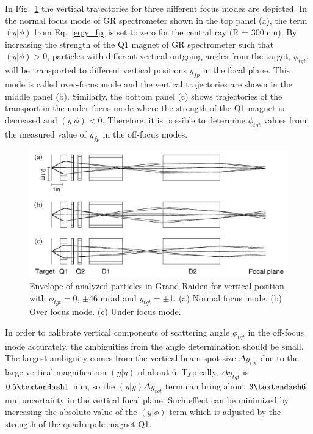 In Fig.~\ref{fig:off_focus} the vertical trajectories for three different focus modes are depicted. In the normal focus mode of GR spectrometer shown in the top panel (a), the term $(y|\phi)$  from Eq.~\ref{eq:y_fp} is set to  zero for the central ray (R = 300 cm). By increasing the strength of the Q1 magnet of GR spectrometer such that $(y|\phi)>0$, particles with different vertical outgoing angles from the target, $\phi_{tgt}$, will be transported to different vertical positions $y_{fp}$ in the focal plane. This mode is called over-focus mode and the vertical trajectories are shown in the middle panel (b). Similarly, the bottom panel (c) shows trajectories of the transport in the under-focus mode where the strength of the Q1 magnet is decreased and $(y|\phi)<0$. Therefore, it is possible to determine  $\phi_{tgt}$ values from the measured value of $y_{fp}$ in the off-focus modes.
\begin{figure}[tpb]
  \begin{center}
    \centerline{\includegraphics[scale=0.15]{graph/ch3/focus_mode}}
    \caption{Envelope of analyzed particles in Grand Raiden for vertical position with $\phi_{tgt}=0$, $\pm$46 mrad and $y_{tgt}=\pm$1. (a) Normal focus mode. (b) Over focus mode. (c) Under focus mode.~\citep{FUJITA200155}}
    \label{fig:off_focus}
  \end{center}
\end{figure}
In order to calibrate vertical components of scattering angle $\phi_{tgt}$ in the off-focus mode accurately, the ambiguities from the angle determination should be small. The largest ambiguity comes from the vertical beam spot size  $\Delta y_{tgt}$ due to the large  vertical magnification $(y|y)$ of about 6. Typically, $\Delta y_{tgt}$ is $0.5\textendash 1$ mm, so the $(y|y)\Delta y_{tgt}$ term can bring about $3\textendash6$ mm uncertainty in the vertical focal plane. Such effect can be minimized by  increasing the absolute value of the $(y|\phi)$ term which is adjusted by the strength of the quadrupole magnet Q1.

